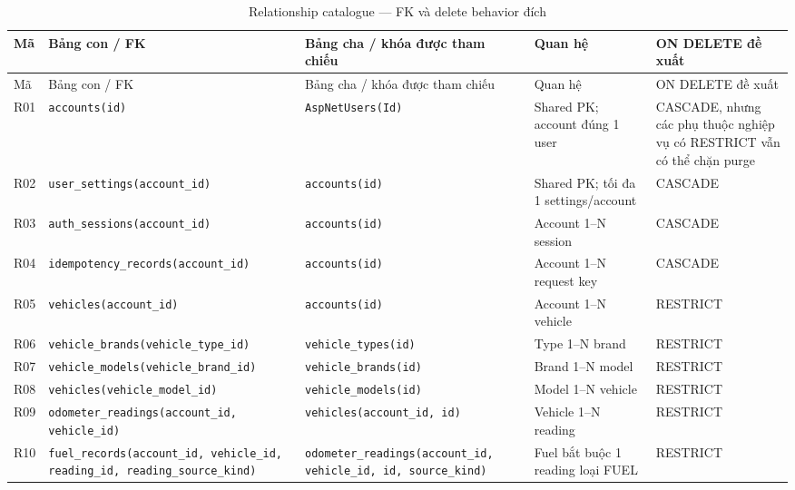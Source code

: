\begin{smalltable}\begin{longtable}{L{0.65cm}L{4.05cm}L{4.05cm}L{2.8cm}L{2.85cm}}
\caption{Relationship catalogue — FK và delete behavior đích}\label{tab:dictionary-1}\\\toprule
Mã & Bảng con / FK & Bảng cha / khóa được tham chiếu & Quan hệ & ON DELETE đề xuất\\\midrule\endfirsthead
\toprule Mã & Bảng con / FK & Bảng cha / khóa được tham chiếu & Quan hệ & ON DELETE đề xuất\\\midrule\endhead
R01 & \texttt{accounts(id)} & \texttt{AspNetUsers(Id)} & Shared PK; account đúng 1 user & CASCADE, nhưng các phụ thuộc nghiệp vụ có RESTRICT vẫn có thể chặn purge\\
R02 & \texttt{user\_\allowbreak{}settings(account\_\allowbreak{}id)} & \texttt{accounts(id)} & Shared PK; tối đa 1 settings/account & CASCADE\\
R03 & \texttt{auth\_\allowbreak{}sessions(account\_\allowbreak{}id)} & \texttt{accounts(id)} & Account 1–N session & CASCADE\\
R04 & \texttt{idempotency\_\allowbreak{}records(account\_\allowbreak{}id)} & \texttt{accounts(id)} & Account 1–N request key & CASCADE\\
R05 & \texttt{vehicles(account\_\allowbreak{}id)} & \texttt{accounts(id)} & Account 1–N vehicle & RESTRICT\\
R06 & \texttt{vehicle\_\allowbreak{}brands(vehicle\_\allowbreak{}type\_\allowbreak{}id)} & \texttt{vehicle\_\allowbreak{}types(id)} & Type 1–N brand & RESTRICT\\
R07 & \texttt{vehicle\_\allowbreak{}models(vehicle\_\allowbreak{}brand\_\allowbreak{}id)} & \texttt{vehicle\_\allowbreak{}brands(id)} & Brand 1–N model & RESTRICT\\
R08 & \texttt{vehicles(vehicle\_\allowbreak{}model\_\allowbreak{}id)} & \texttt{vehicle\_\allowbreak{}models(id)} & Model 1–N vehicle & RESTRICT\\
R09 & \texttt{odometer\_\allowbreak{}readings(account\_\allowbreak{}id,\allowbreak{} vehicle\_\allowbreak{}id)} & \texttt{vehicles(account\_\allowbreak{}id,\allowbreak{} id)} & Vehicle 1–N reading & RESTRICT\\
R10 & \texttt{fuel\_\allowbreak{}records(account\_\allowbreak{}id,\allowbreak{} vehicle\_\allowbreak{}id,\allowbreak{} reading\_\allowbreak{}id,\allowbreak{} reading\_\allowbreak{}source\_\allowbreak{}kind)} & \texttt{odometer\_\allowbreak{}readings(account\_\allowbreak{}id,\allowbreak{} vehicle\_\allowbreak{}id,\allowbreak{} id,\allowbreak{} source\_\allowbreak{}kind)} & Fuel bắt buộc 1 reading loại FUEL & RESTRICT\\

\end{longtable}
\end{smalltable}
